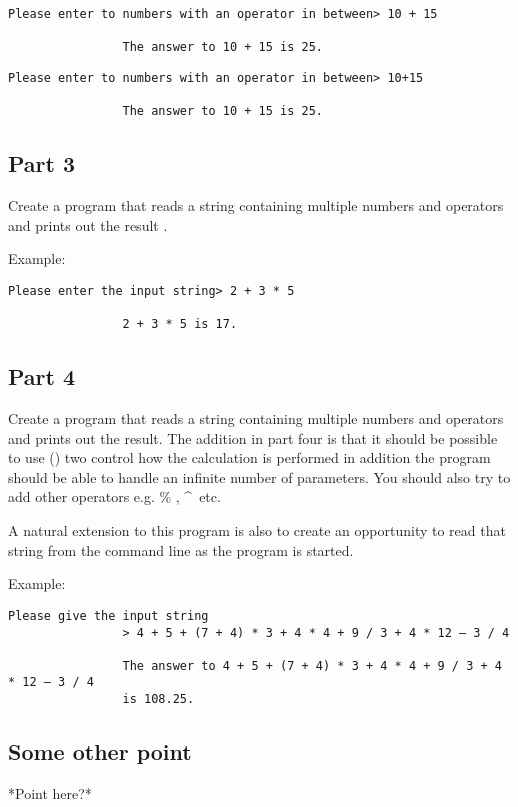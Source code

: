 \documentclass{article}
\begin{document}
			\begin{lstlisting}[numbers=none]
				Please enter to numbers with an operator in between> 10 + 15
				
				The answer to 10 + 15 is 25.
			\end{lstlisting}

			

			\begin{lstlisting}[numbers=none]
				Please enter to numbers with an operator in between> 10+15
				
				The answer to 10 + 15 is 25.
			\end{lstlisting}
			
		\subsection{Part 3}
			Create a program that reads a string containing multiple numbers and operators and prints out the result .
			
			Example:
			\begin{lstlisting}[numbers=none]
				Please enter the input string> 2 + 3 * 5
				
				2 + 3 * 5 is 17.
			\end{lstlisting}
		\subsection{Part 4}
			Create a program that reads a string containing multiple numbers and operators and prints out the result. The addition in part four is that it should be possible to use () two control how the calculation is performed in addition the program should be able to handle an infinite number of parameters. You should also try to add other operators e.g.  \% , \^~etc. \cite{UML2}
			
			A natural extension to this program is also to create an opportunity to read that string from the command line as the program is started. ~\cite{cpplang4}
			
			Example:
			\begin{lstlisting}[numbers=none]
				Please give the input string
				> 4 + 5 + (7 + 4) * 3 + 4 * 4 + 9 / 3 + 4 * 12 – 3 / 4
				
				The answer to 4 + 5 + (7 + 4) * 3 + 4 * 4 + 9 / 3 + 4 * 12 – 3 / 4
				is 108.25.
			\end{lstlisting}
		\subsection{Some other point}
			*Point here?*
	\\ \\
\end{document}

